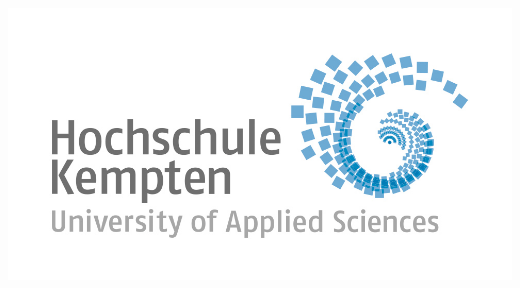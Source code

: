 \documentclass[
12pt, %
oneside, %
english, %
onehalfspacing, %
liststotoc, %
JumpToContents, %
parskip, %
headsepline, %
]{MastersDoctoralThesis} %
\author{Lu \textsc{Knoblich}, Christian \textsc{Schmitz}}
\begin{document}
\frontmatter %



\pagestyle{plain} %




\begin{titlepage}
    
    
\iftrue
\begin{center}

\includegraphics[scale=0.15]{Figures/logo-thk.jpg}\\




\end{center}
\end{titlepage}
\end{document}
